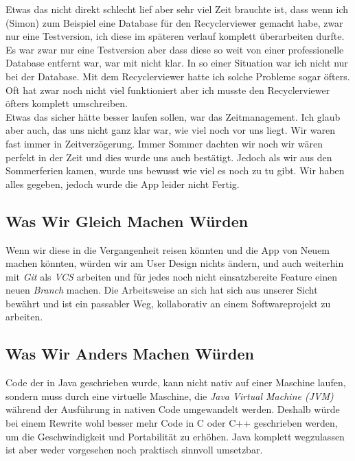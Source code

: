 \documentclass[a4paper,11pt]{article}
\begin{document}
Etwas das nicht direkt schlecht lief aber sehr viel Zeit brauchte ist, dass wenn ich (Simon) zum Beispiel eine Database für den Recyclerviewer gemacht habe, zwar nur eine Testversion, 
ich diese im späteren verlauf komplett überarbeiten durfte. Es war zwar nur eine Testversion aber dass diese so weit von einer professionelle Database entfernt war, war mit nicht klar. 
In so einer Situation war ich nicht nur bei der Database. Mit dem Recyclerviewer hatte ich solche Probleme sogar öfters. Oft hat zwar noch nicht viel funktioniert aber ich musste den Recyclerviewer
öfters komplett umschreiben. \\


Etwas das sicher hätte besser laufen sollen, war das Zeitmanagement. Ich glaub aber auch, das uns nicht ganz klar war, wie viel 
noch vor uns liegt. Wir waren fast immer in Zeitverzögerung. Immer Sommer dachten wir noch wir wären perfekt in der Zeit und dies wurde uns auch bestätigt. Jedoch
als wir aus den Sommerferien kamen, wurde uns bewusst wie viel es noch zu tu gibt. Wir haben alles gegeben, jedoch wurde die App leider nicht Fertig. 
\subsection{Was Wir Gleich Machen Würden}
Wenn wir diese in die Vergangenheit reisen könnten und die App von Neuem machen könnten, würden wir am User Design nichts ändern, und auch weiterhin mit \textit{Git} als \textit{VCS} arbeiten und für jedes noch nicht einsatzbereite Feature einen neuen \textit{Branch} machen. Die Arbeitsweise an sich hat sich aus unserer Sicht bewährt und ist ein passabler Weg, kollaborativ an einem Softwareprojekt zu arbeiten.
\subsection{Was Wir Anders Machen Würden}

Code der in Java geschrieben wurde, kann nicht nativ auf einer Maschine laufen, sondern muss durch eine virtuelle Maschine, die \textit{Java Virtual Machine (JVM)} während der Ausführung in nativen Code umgewandelt werden. Deshalb würde bei einem Rewrite wohl besser mehr Code in C oder C++ geschrieben werden, um die Geschwindigkeit und Portabilität zu erhöhen. Java komplett wegzulassen ist aber weder vorgesehen noch praktisch sinnvoll umsetzbar. \\
\end{document}
